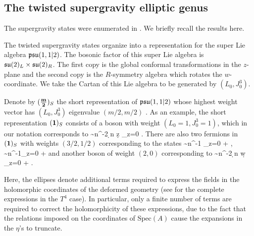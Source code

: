 \documentclass[../main.tex]{subfiles}
\begin{document}
%

\subsection{The twisted supergravity elliptic genus}

The supergravity states were enumerated in \cite{CP}. We briefly recall the results here. 

The twisted supergravity states organize into a representation for the super Lie algebra $\mathfrak{psu}(1,1|2)$.
The bosonic factor of this super Lie algebra is $\mathfrak{su}(2)_L \times \mathfrak{su}(2)_R$. 
The first copy is the global conformal transformations in the $z$-plane and the second copy is the $R$-symmetry algebra which rotates the $w$-coordinate.
We take the Cartan of this Lie algebra to be generated by $(L_0, J_0^3)$. 
  
Denote by $(\frac{\bf m}{\bf 2})_S$ the short representation of $\mathfrak{psu}(1,1|2)$ whose highest weight vector has $(L_0, J_0^3)$ eigenvalue $(m/2,m/2)$ \cite{deBoerEG}. 
As an example, the short representation $({\bf 1})_S$ consists of a boson with weight $(L_0 = 1, J_0^3 = 1)$, which in our notation corresponds to 
\beqn
\mu \sim n^{-2} \d \log n \d z \delta_{z=0}  .
\eeqn 
There are also two fermions in $({\bf 1})_S$ with weights $(3/2,1/2)$ corresponding to the states
\beqn
\alpha \sim n^{-1} \delta_{z=0} + \cdots , \quad \gamma \sim n^{-1}\delta_{z=0} + \cdots
\eeqn
and another boson of weight $(2,0)$ corresponding to 
\beqn
\mu \sim n^{-2} \d \log n \d w \delta_{z=0} + \cdots .
\eeqn 

Here, the ellipses denote additional terms required to express the fields in the holomorphic coordinates of the deformed geometry (see \cite{CP} for the complete expressions in the $T^4$ case). In particular, only a finite number of terms are required to correct the holomorphicity of these expressions, due to the fact that the relations imposed on the coordinates of $\textrm{Spec}(A)$ cause the expansions in the $\eta$'s to truncate. 
\end{document}
